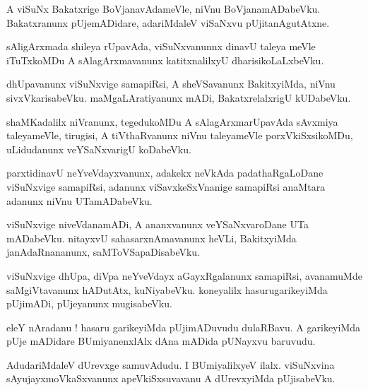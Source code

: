 \documentclass{article}
\begin{document}
\begin{mn}%
A viSuNx Bakatxrige BoVjanavAdameVle, niVnu BoVjanamADabeVku. Bakatxranunx pUjemADidare, 
adariMdaleV viSaNxvu pUjitanAgutAtxne.
\end{mn}

\begin{mn}%
sAligArxmada shileya rUpavAda, viSuNxvanunnx dinavU taleya meVle iTuTxkoMDu A sAlagArxmavanunx 
katitxnalilxyU dharisikoLaLxbeVku.
\end{mn}

\begin{mn}%
dhUpavanunx viSuNxvige samapiRsi, A sheVSavanunx BakitxyiMda, niVnu sivxVkarisabeVku. 
maMgaLAratiyanunx mADi, BakatxrelalxrigU kUDabeVku.
\end{mn}

\begin{mn}%
shaMKadalilx niVranunx, tegedukoMDu A sAlagArxmarUpavAda sAvxmiya taleyameVle, tirugisi, A 
tiVthaRvanunx niVnu taleyameVle porxVkiSxsikoMDu, uLidudanunx veYSaNxvarigU koDabeVku.
\end{mn}

\begin{mn}%
parxtidinavU neYveVdayxvanunx, adakekx neVkAda padathaRgaLoDane viSuNxvige samapiRsi, adanunx 
viSavxkeSxVnanige samapiRsi anaMtara adanunx niVnu UTamADabeVku.
\end{mn}

\begin{mn}%
viSuNxvige niveVdanamADi, A ananxvanunx veYSaNxvaroDane UTa  mADabeVku. nitayxvU sahasarxnAmavanunx 
heVLi, BakitxyiMda janAdaRnananunx, saMToVSapaDisabeVku.
\end{mn}

\begin{mn}%
viSuNxvige dhUpa, diVpa neYveVdayx aGayxRgalanunx samapiRsi, avanamuMde saMgiVtavanunx hADutAtx, 
kuNiyabeVku. koneyalilx hasurugarikeyiMda pUjimADi, pUjeyanunx mugisabeVku.
\end{mn}

\begin{mn}%
eleY nAradanu ! hasaru garikeyiMda pUjimADuvudu dulaRBavu. A garikeyiMda pUje mADidare 
BUmiyanenxlAlx dAna mADida pUNayxvu baruvudu.
\end{mn}

\begin{mn}%
AdudariMdaleV dUrevxge samuvAdudu. I BUmiyalilxyeV ilalx. viSuNxvina sAyujayxmoVkaSxvanunx 
apeVkiSxsuvavanu A dUrevxyiMda pUjisabeVku.
\end{mn}
\end{document}

